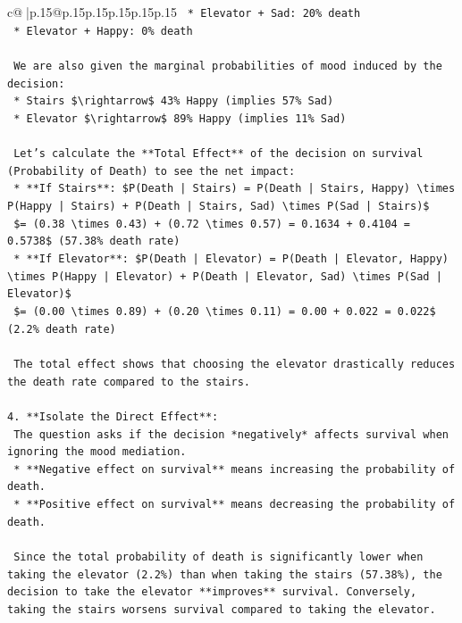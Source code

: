 \documentclass{article}
\begin{document}
{\begin{supertabular}{c@{$\;$}|p{.15\linewidth}@{}p{.15\linewidth}p{.15\linewidth}p{.15\linewidth}p{.15\linewidth}p{.15\linewidth}}
{{{\texttt{    *   Elevator + Sad: 20\% death} \\
\texttt{    *   Elevator + Happy: 0\% death} \\
\\ 
\texttt{    We are also given the marginal probabilities of mood induced by the decision:} \\
\texttt{    *   Stairs \$\textbackslash{}rightarrow\$ 43\% Happy (implies 57\% Sad)} \\
\texttt{    *   Elevator \$\textbackslash{}rightarrow\$ 89\% Happy (implies 11\% Sad)} \\
\\ 
\texttt{    Let's calculate the **Total Effect** of the decision on survival (Probability of Death) to see the net impact:} \\
\texttt{    *   **If Stairs**: \$P(Death | Stairs) = P(Death | Stairs, Happy) \textbackslash{}times P(Happy | Stairs) + P(Death | Stairs, Sad) \textbackslash{}times P(Sad | Stairs)\$} \\
\texttt{        \$= (0.38 \textbackslash{}times 0.43) + (0.72 \textbackslash{}times 0.57) = 0.1634 + 0.4104 = 0.5738\$ (57.38\% death rate)} \\
\texttt{    *   **If Elevator**: \$P(Death | Elevator) = P(Death | Elevator, Happy) \textbackslash{}times P(Happy | Elevator) + P(Death | Elevator, Sad) \textbackslash{}times P(Sad | Elevator)\$} \\
\texttt{        \$= (0.00 \textbackslash{}times 0.89) + (0.20 \textbackslash{}times 0.11) = 0.00 + 0.022 = 0.022\$ (2.2\% death rate)} \\
\\ 
\texttt{    The total effect shows that choosing the elevator drastically reduces the death rate compared to the stairs.} \\
\\ 
\texttt{4.  **Isolate the Direct Effect**:} \\
\texttt{    The question asks if the decision *negatively* affects survival when ignoring the mood mediation.} \\
\texttt{    *   **Negative effect on survival** means increasing the probability of death.} \\
\texttt{    *   **Positive effect on survival** means decreasing the probability of death.} \\
\\ 
\texttt{    Since the total probability of death is significantly lower when taking the elevator (2.2\%) than when taking the stairs (57.38\%), the decision to take the elevator **improves** survival. Conversely, taking the stairs worsens survival compared to taking the elevator.} \\
}}}
\end{supertabular}}
\end{document}
